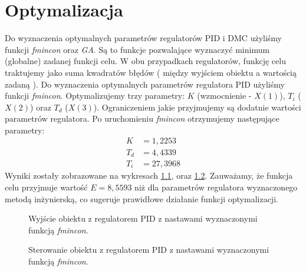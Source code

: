 \chapter{Optymalizacja}
Do wyznaczenia optymalnych parametrów regulatorów PID i DMC użyliśmy funkcji \emph{fmincon} oraz \emph{GA}. Są to funkcje pozwalające wyznaczyć minimum (globalne) zadanej funkcji celu.
W obu przypadkach regulatorów, funkcję celu traktujemy jako suma kwadratów błędów ( między wyjściem obiektu a wartością zadaną ).
Do wyznaczenia optymalnych parametrów regulatora PID użyliśmy funkcji \emph{fmincon}. Optymalizujemy trzy parametry: $K$ (wzmocnienie - $X(1)$), $T_i$ ($X(2)$) oraz $T_d$ ($X(3)$).
Ograniczeniem jakie przyjmujemy są dodatnie wartości parametrów regulatora. Po uruchomieniu \emph{fmincon} otrzymujemy następujące parametry:
\begin{align}
  K &= 1,2253 \nonumber \\
  T_d &= 4,4339 \\
  T_i &= 27,3968 \nonumber
\end{align}
Wyniki zostały zobrazowane na wykresach \ref{fig:optim_pid_out}, oraz \ref{fig:optim_pid_ster}.
Zauważamy, że funkcja celu przyjmuje wartość $E = 8,5593$ niż dla parametrów regulatora wyznaczonego metodą inżynierską, co sugeruje prawidłowe działanie funkcji optymalizacji.

\begin{figure}[tb]
\centering
{}
\caption{Wyjście obiektu z regulatorem PID z nastawami wyznaczonymi funkcją \emph{fmincon}.}
\label{fig:optim_pid_out}
\end{figure}

\begin{figure}[tb]
\centering
{}
\caption{Sterowanie obiektu z regulatorem PID z nastawami wyznaczonymi funkcją \emph{fmincon}.}
\label{fig:optim_pid_ster}
\end{figure}

